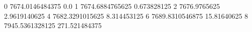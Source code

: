 0 7674.0146484375 0.0
1 7674.6884765625 0.673828125
2 7676.9765625 2.9619140625
4 7682.3291015625 8.314453125
6 7689.8310546875 15.81640625
8 7945.5361328125 271.521484375
